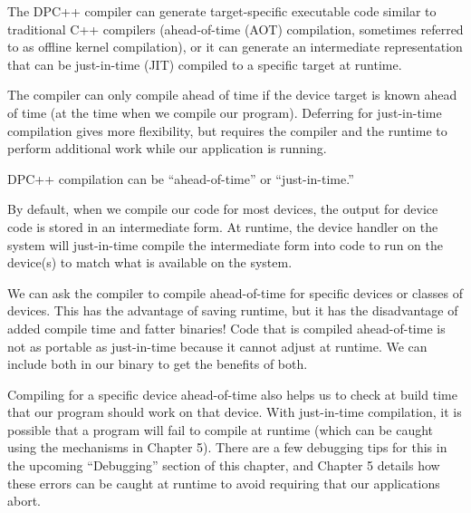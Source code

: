 The DPC++ compiler can generate target-specific executable code similar to traditional C++ compilers (ahead-of-time (AOT) compilation, sometimes referred to as offline kernel compilation), or it can generate an intermediate representation that can be just-in-time (JIT) compiled to a specific target at runtime.\par

The compiler can only compile ahead of time if the device target is known ahead of time (at the time when we compile our program). Deferring for just-in-time compilation gives more flexibility, but requires the compiler and the runtime to perform additional work while our application is running.\par

\begin{tcolorbox}[colback=red!5!white,colframe=red!75!black]
DPC++ compilation can be “ahead-of-time” or “just-in-time.”
\end{tcolorbox}

By default, when we compile our code for most devices, the output for device code is stored in an intermediate form. At runtime, the device handler on the system will just-in-time compile the intermediate form into code to run on the device(s) to match what is available on the system.\par

We can ask the compiler to compile ahead-of-time for specific devices or classes of devices. This has the advantage of saving runtime, but it has the disadvantage of added compile time and fatter binaries! Code that is compiled ahead-of-time is not as portable as just-in-time because it cannot adjust at runtime. We can include both in our binary to get the benefits of both.\par

Compiling for a specific device ahead-of-time also helps us to check at build time that our program should work on that device. With just-in-time compilation, it is possible that a program will fail to compile at runtime (which can be caught using the mechanisms in Chapter 5). There are a few debugging tips for this in the upcoming “Debugging” section of this chapter, and Chapter 5 details how these errors can be caught at runtime to avoid requiring that our applications abort.\par


